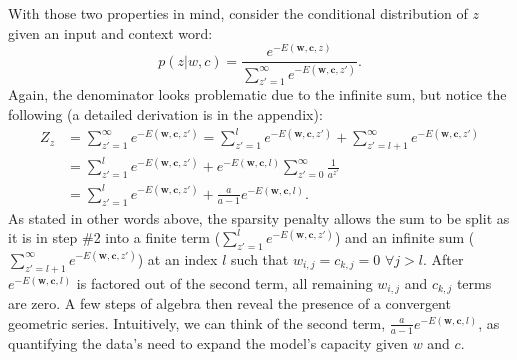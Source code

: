 \documentclass{article} %
\begin{document}
With those two properties in mind, consider the conditional distribution of $z$ given an input and context word: \begin{equation}
p(z | w, c) = \frac{e^{-E(\mathbf{w}, \mathbf{c}, z)}}{\sum_{z'=1}^{\infty} e^{-E(\mathbf{w}, \mathbf{c}, z')}}. \end{equation}  Again, the denominator looks problematic due to the infinite sum, but notice the following (a detailed derivation is in the appendix): \begin{equation}\begin{split}\label{z_finite}
Z_{z} &= \sum_{z'=1}^{\infty} e^{-E(\mathbf{w}, \mathbf{c}, z')}  = \sum_{z'=1}^{l} e^{-E(\mathbf{w}, \mathbf{c}, z')} + \sum_{z'=l+1}^{\infty} e^{-E(\mathbf{w}, \mathbf{c}, z')} \\ &= \sum_{z'=1}^{l} e^{-E(\mathbf{w}, \mathbf{c}, z')} + e^{-E(\mathbf{w}, \mathbf{c}, l)} \sum_{z'=0}^{\infty} \frac{1}{a^{  z' }} \\ &= \sum_{z'=1}^{l} e^{-E(\mathbf{w}, \mathbf{c}, z')} + \frac{a}{a-1}e^{-E(\mathbf{w}, \mathbf{c}, l)}.
\end{split}
\end{equation}  As stated in other words above, the sparsity penalty allows the sum to be split as it is in step \#2 into a finite term ($\sum_{z'=1}^{l} e^{-E(\mathbf{w}, \mathbf{c}, z')}$) and an infinite sum ($\sum_{z'=l+1}^{\infty} e^{-E(\mathbf{w}, \mathbf{c}, z')}$) at an index $l$ such that $w_{i,j}=c_{k,j}=0$ $\forall j>l$.  After $e^{-E(\mathbf{w}, \mathbf{c}, l)}$ is factored out of the second term, all remaining $w_{i,j}$ and $c_{k,j}$ terms are zero.  A few steps of algebra then reveal the presence of a convergent geometric series.  Intuitively, we can think of the second term, $\frac{a}{a-1}e^{-E(\mathbf{w}, \mathbf{c}, l)}$, as quantifying the data's need to expand the model's capacity given $w$ and $c$.   
\end{document}
